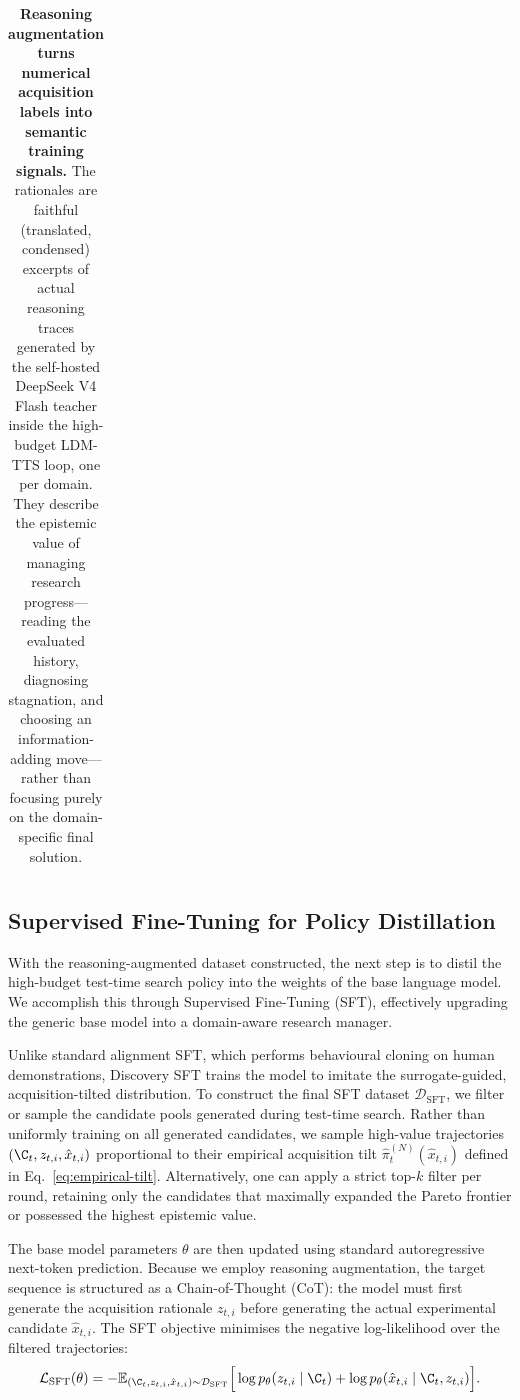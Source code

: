 \begin{table}[t]
\begin{tabular}{@{}p{0.18\linewidth}p{0.36\linewidth}p{0.40\linewidth}@{}}
\bottomrule
\end{tabular}
\vspace{0.5em}
\caption{\textbf{Reasoning augmentation turns numerical acquisition labels into semantic training signals.}
The rationales are faithful (translated, condensed) excerpts of actual reasoning traces generated by the
self-hosted DeepSeek V4 Flash teacher inside the high-budget LDM-TTS loop, one per domain. They describe the
epistemic value of managing research progress---reading the evaluated history, diagnosing stagnation, and
choosing an information-adding move---rather than focusing purely on the domain-specific final solution.}
\label{tab:reasoning-augmentation}
\end{table}


\subsection{Supervised Fine-Tuning for Policy Distillation}
\label{sec:sft-training}

With the reasoning-augmented dataset constructed, the next step is to distil the high-budget test-time search policy into the weights of the base language model. We accomplish this through Supervised Fine-Tuning (SFT), effectively upgrading the generic base model into a domain-aware research manager.

Unlike standard alignment SFT, which performs behavioural cloning on human demonstrations, Discovery SFT trains the model to imitate the surrogate-guided, acquisition-tilted distribution. To construct the final SFT dataset $\mathcal{D}_{\text{SFT}}$, we filter or sample the candidate pools generated during test-time search. Rather than uniformly training on all generated candidates, we sample high-value trajectories $(\C_t, z_{t,i}, \hat{x}_{t,i})$ proportional to their empirical acquisition tilt $\widehat{\pi}^{(N)}_t(\hat{x}_{t,i})$ defined in Eq.~\eqref{eq:empirical-tilt}. Alternatively, one can apply a strict top-$k$ filter per round, retaining only the candidates that maximally expanded the Pareto frontier or possessed the highest epistemic value.

The base model parameters $\theta$ are then updated using standard autoregressive next-token prediction. Because we employ reasoning augmentation, the target sequence is structured as a Chain-of-Thought (CoT): the model must first generate the acquisition rationale $z_{t,i}$ before generating the actual experimental candidate $\hat{x}_{t,i}$. The SFT objective minimises the negative log-likelihood over the filtered trajectories:
\begin{equation}
\label{eq:sft-loss}
  \mathcal{L}_{\text{SFT}}(\theta)
  =
  -\mathbb{E}_{(\C_t, z_{t,i}, \hat{x}_{t,i}) \sim \mathcal{D}_{\text{SFT}}}
  \Big[ \log p_\theta(z_{t,i} \mid \C_t) + \log p_\theta(\hat{x}_{t,i} \mid \C_t, z_{t,i}) \Big].
\end{equation}

